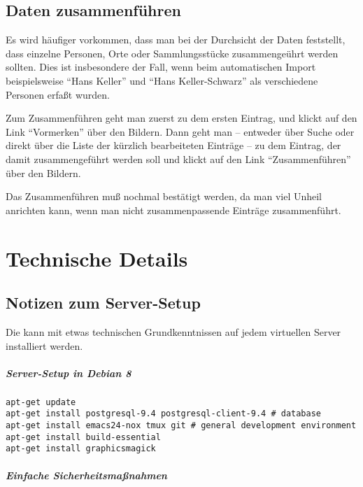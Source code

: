 \documentclass[12pt]{scrreprt}
\begin{document}
\section{Daten zusammenführen}
Es wird häufiger vorkommen, dass man bei der Durchsicht der Daten feststellt, dass
einzelne Personen, Orte oder Sammlungsstücke zusammengeührt werden sollten. Dies ist insbesondere
der Fall, wenn beim automatischen Import beispielsweise ``Hans Keller'' und ``Hans Keller-Schwarz''
als verschiedene Personen erfaßt wurden.

Zum Zusammenführen geht man zuerst zu dem ersten Eintrag, und klickt auf den Link ``Vormerken''
über den Bildern. Dann geht man -- entweder über Suche oder direkt über die Liste der kürzlich bearbeiteten
Einträge -- zu dem Eintrag, der damit zusammengeführt werden soll und klickt auf den Link
``Zusammenführen'' über den Bildern.

Das Zusammenführen muß nochmal bestätigt werden, da man viel Unheil
anrichten kann, wenn man nicht zusammenpassende Einträge
zusammenführt.


\appendix

\chapter{Technische Details}

\section{Notizen zum Server-Setup}

Die \DB{} kann mit etwas technischen Grundkenntnissen auf jedem
virtuellen Server installiert werden.


\paragraph{Server-Setup in Debian 8}

\begin{verbatim}
apt-get update
apt-get install postgresql-9.4 postgresql-client-9.4 # database
apt-get install emacs24-nox tmux git # general development environment
apt-get install build-essential
apt-get install graphicsmagick
\end{verbatim}

\paragraph{Einfache Sicherheitsmaßnahmen}
\end{document}
